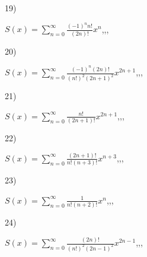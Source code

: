 \documentclass[11pt, ukrainian]{article}
\begin{document}
\par
\vspace{0.9cm}
19) \space 
{%
{$S(x)=\sum\limits_{n=0}^{\infty}{\frac{{(-1)^n}{n!}}{(2n)!}}{x^{{n}}}$},,, \par \smallskip  
}
\par
\vspace{0.9cm}
20) \space 
{%
{$S(x)=\sum\limits_{n=0}^{\infty}{\frac{{(-1)^n}(2n)!}{{(n!)^2}{(2n+1)^2}}}{x^{{2n+1}}}$},,, \par \smallskip  
}
\par
\newpage
21) \space 
{%
{$S(x)=\sum\limits_{n=0}^{\infty}{\frac{n!}{(2n+1)!}}{x^{{2n+1}}}$},,, \par \smallskip  
}
\par
\vspace{0.9cm}
22) \space 
{%
{$S(x)=\sum\limits_{n=0}^{\infty}{\frac{(2n+1)!}{n!(n+3)!}}{x^{{n+3}}}$},,, \par \smallskip  
}
\par
\vspace{0.9cm}
23) \space 
{%
{$S(x)=\sum\limits_{n=0}^{\infty}{\frac{1}{n!(n+2)!}}{x^{{n}}}$},,, \par \smallskip  
}
\par
\vspace{0.9cm}
24) \space 
{%
{$S(x)=\sum\limits_{n=0}^{\infty}{\frac{(2n)!}{{(n!)^2}{(2n-1)^2}}}{x^{{2n-1}}}$},,, \par \smallskip  
}
\end{document}
